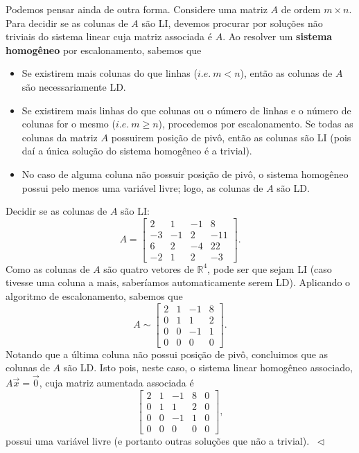Podemos pensar ainda de outra forma. Considere uma matriz $A$ de ordem $m\times n.$ Para decidir se as colunas de $A$ são LI, devemos procurar por soluções não triviais do sistema linear cuja matriz associada é $A$. Ao resolver um \textbf{sistema homogêneo} por escalonamento, sabemos que
\begin{itemize}
  \item Se existirem mais colunas do que linhas ($i.e. \ m<n$), então as colunas de $A$ são necessariamente LD.
  \item Se existirem mais linhas do que colunas ou o número de linhas e o número de colunas for o mesmo ($i.e. \ m \geq n$), procedemos por escalonamento. Se todas as colunas da matriz $A$ possuirem posição de pivô, então as colunas são LI (pois daí a única solução do sistema homogêneo é a trivial).
  \item No caso de alguma coluna não possuir posição de pivô, o sistema homogêneo possui pelo menos uma variável livre; logo, as colunas de $A$ são LD.
\end{itemize}

\begin{ex}
Decidir se as colunas de $A$ são LI:
\begin{equation}
A = \left[
\begin{array}{rrrr}
   2&1&-1&8\\
   -3&-1&2&-11\\
   6&2&-4&22\\
   -2&1&2&-3
\end{array}
\right].
\end{equation} Como as colunas de $A$ são quatro vetores de $\mathbb{R}^4$, pode ser que sejam LI (caso tivesse uma coluna a mais, saberíamos automaticamente serem LD). Aplicando o algoritmo de escalonamento, sabemos que
\begin{equation}
A \sim \left[
\begin{array}{cccc}
   2&1&-1&8\\
   0&1&1&2\\
   0&0&-1&1\\
   0&0&0&0
\end{array}
\right].
\end{equation} Notando que a última coluna não possui posição de pivô, concluimos que as colunas de $A$ são LD. Isto pois, neste caso, o sistema linear homogêneo associado, $A \vec{x} = \vec{0}$, cuja matriz aumentada associada é
\begin{equation}
\left[
\begin{array}{cccc|c}
   2&1&-1&8&0\\
   0&1&1&2& 0\\
   0&0&-1&1&0\\
   0&0&0&0&0
\end{array}
\right],
\end{equation} possui uma variável livre (e portanto outras soluções que não a trivial). $\ \lhd$
\end{ex}

